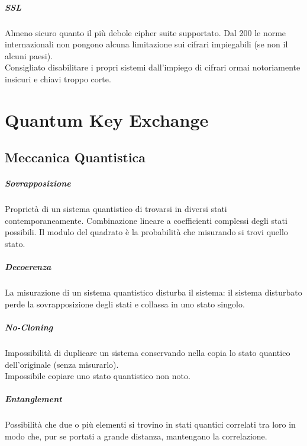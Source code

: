 \documentclass[10pt]{book}
\begin{document}
\paragraph{SSL} Almeno sicuro quanto il più debole cipher suite supportato. Dal 200 le norme internazionali non pongono alcuna limitazione sui cifrari impiegabili (se non il alcuni paesi).\\
Consigliato disabilitare i propri sistemi dall'impiego di cifrari ormai notoriamente insicuri e chiavi troppo corte.
\chapter{Quantum Key Exchange}
\section{Meccanica Quantistica}
\paragraph{Sovrapposizione} Proprietà di un sistema quantistico di trovarsi in diversi stati contemporaneamente. Combinazione lineare a coefficienti complessi degli stati possibili. Il modulo del quadrato è la probabilità che misurando si trovi quello stato.
\paragraph{Decoerenza} La misurazione di un sistema quantistico disturba il sistema: il sistema disturbato perde la sovrapposizione degli stati e collassa in uno stato singolo.
\paragraph{No-Cloning} Impossibilità di duplicare un sistema conservando nella copia lo stato quantico dell'originale (senza misurarlo).\\
Impossibile copiare uno stato quantistico non noto.
\paragraph{Entanglement} Possibilità che due o più elementi si trovino in stati quantici correlati tra loro in modo che, pur se portati a grande distanza, mantengano la correlazione.
\end{document}
